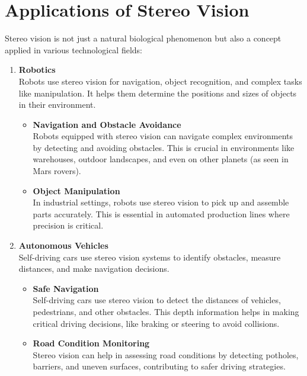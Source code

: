 \documentclass[22pt]{report}
\begin{document}
    \section{Applications of Stereo Vision}
        Stereo vision is not just a natural biological phenomenon but also a concept applied in various technological fields:
        \begin{enumerate}
            \item \textbf{Robotics}\\
                Robots use stereo vision for navigation, object recognition, and complex tasks like manipulation. It helps them determine the positions and sizes of objects in their environment.
                \begin{itemize}
                    \item\textbf{Navigation and Obstacle Avoidance}\\
                        Robots equipped with stereo vision can navigate complex environments by detecting and avoiding obstacles. This is crucial in environments like warehouses, outdoor landscapes, and even on other planets (as seen in Mars rovers).\\
                    \item \textbf{Object Manipulation}\\
                        In industrial settings, robots use stereo vision to pick up and assemble parts accurately. This is essential in automated production lines where precision is critical.
                \end{itemize}
            \item \textbf{Autonomous Vehicles}\\
                Self-driving cars use stereo vision systems to identify obstacles, measure distances, and make navigation decisions.
                \begin{itemize}
                    \item \textbf{Safe Navigation}\\
                        Self-driving cars use stereo vision to detect the distances of vehicles, pedestrians, and other obstacles. This depth information helps in making critical driving decisions, like braking or steering to avoid collisions.
                    \item \textbf{Road Condition Monitoring}\\
                        Stereo vision can help in assessing road conditions by detecting potholes, barriers, and uneven surfaces, contributing to safer driving strategies.

\end{itemize}
\end{enumerate}
\end{document}
